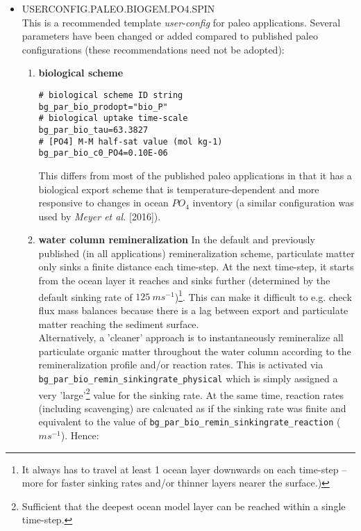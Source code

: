 \documentclass[11pt,fleqn]{book} %
\begin{document}
\begin{itemize}[noitemsep]
\vspace{2mm}
\item \textsf{\footnotesize USERCONFIG.PALEO.BIOGEM.PO4.SPIN}
\vspace{1mm}
\\This is a recommended template \textit{user-config} for paleo applications. Several parameters have been changed or added compared to published paleo configurations (these recommendations need not be adopted):
\begin{enumerate}[noitemsep]
\vspace{1mm}
\item \textbf{biological scheme}
\small\vspace{-1mm}\begin{verbatim}
# biological scheme ID string
bg_par_bio_prodopt="bio_P"
# biological uptake time-scale
bg_par_bio_tau=63.3827
# [PO4] M-M half-sat value (mol kg-1)
bg_par_bio_c0_PO4=0.10E-06
\end{verbatim}\vspace{-1mm}\normalsize
This differs from most of the published paleo applications in that it has a biological export scheme that is temperature-dependent and more responsive to changes in ocean \(PO_{4}\) inventory (a similar configuration was used by \textit{Meyer et al.} [2016]).
\vspace{1mm}
\item \textbf{water column remineralization}
In the default and previously published (in all applications) remineralization scheme, particulate matter only sinks a finite distance each time-step. At the next time-step, it starts from the ocean layer it reaches and sinks further (determined by the default sinking rate of \(125\:ms^{-1}\))\footnote{It always has to travel at least 1 ocean layer downwards on each time-step -- more for faster sinking rates and/or thinner layers nearer the surface.)}. This can make it difficult to e.g. check flux mass balances because there is a lag between export and particulate matter reaching the sediment surface.
\\Alternatively, a 'cleaner' approach is to instantaneously remineralize all particulate organic matter throughout the water column according to the remineralization profile and/or reaction rates. This is activated via \texttt{bg\_par\_bio\_remin\_sinkingrate\_physical} which is simply assigned a very 'large'\footnote{Sufficient that the deepest ocean model layer can be reached within a single time-step.} value for the sinking rate. At the same time, reaction rates (including scavenging) are calcuated as if the sinking rate was finite and equivalent to the value of \texttt{bg\_par\_bio\_remin\_sinkingrate\_reaction} (\(ms^{-1}\)). Hence:

\end{enumerate}
\end{itemize}
\end{document}
